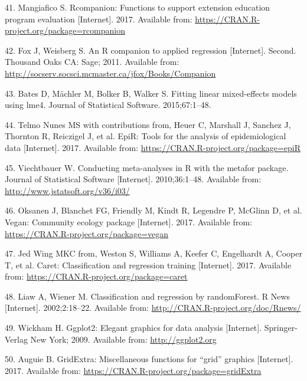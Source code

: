 \documentclass[12pt,]{article}
\begin{document}
\hypertarget{ref-rcompanion_citation_2017}{}
41. Mangiafico S. Rcompanion: Functions to support extension education
program evaluation {[}Internet{]}. 2017. Available from:
\url{https://CRAN.R-project.org/package=rcompanion}

\hypertarget{ref-car_citation_2011}{}
42. Fox J, Weisberg S. An R companion to applied regression
{[}Internet{]}. Second. Thousand Oaks CA: Sage; 2011. Available from:
\url{http://socserv.socsci.mcmaster.ca/jfox/Books/Companion}

\hypertarget{ref-lme4_citation_2015}{}
43. Bates D, Mächler M, Bolker B, Walker S. Fitting linear mixed-effects
models using lme4. Journal of Statistical Software. 2015;67:1--48.

\hypertarget{ref-epir_citation_2017}{}
44. Telmo Nunes MS with contributions from, Heuer C, Marshall J, Sanchez
J, Thornton R, Reiczigel J, et al. EpiR: Tools for the analysis of
epidemiological data {[}Internet{]}. 2017. Available from:
\url{https://CRAN.R-project.org/package=epiR}

\hypertarget{ref-metafor_citation_2010}{}
45. Viechtbauer W. Conducting meta-analyses in R with the metafor
package. Journal of Statistical Software {[}Internet{]}. 2010;36:1--48.
Available from: \url{http://www.jstatsoft.org/v36/i03/}

\hypertarget{ref-vegan_citation_2017}{}
46. Oksanen J, Blanchet FG, Friendly M, Kindt R, Legendre P, McGlinn D,
et al. Vegan: Community ecology package {[}Internet{]}. 2017. Available
from: \url{https://CRAN.R-project.org/package=vegan}

\hypertarget{ref-caret_citation_2017}{}
47. Jed Wing MKC from, Weston S, Williams A, Keefer C, Engelhardt A,
Cooper T, et al. Caret: Classification and regression training
{[}Internet{]}. 2017. Available from:
\url{https://CRAN.R-project.org/package=caret}

\hypertarget{ref-randomforest_citation_2002}{}
48. Liaw A, Wiener M. Classification and regression by randomForest. R
News {[}Internet{]}. 2002;2:18--22. Available from:
\url{http://CRAN.R-project.org/doc/Rnews/}

\hypertarget{ref-ggplot2_citation_2009}{}
49. Wickham H. Ggplot2: Elegant graphics for data analysis
{[}Internet{]}. Springer-Verlag New York; 2009. Available from:
\url{http://ggplot2.org}

\hypertarget{ref-gridextra_citation_2017}{}
50. Auguie B. GridExtra: Miscellaneous functions for ``grid'' graphics
{[}Internet{]}. 2017. Available from:
\url{https://CRAN.R-project.org/package=gridExtra}
\end{document}
